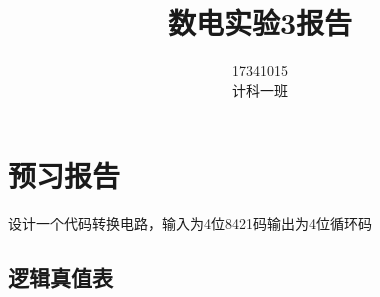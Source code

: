 \documentclass[11pt,UTF8]{ctexart}
\title{数电实验3报告}
\author{17341015\quad数据科学与计算机学院\\计科一班\quad陈鸿峥}
\date{}
\begin{document}
\maketitle
\vspace{-50pt}%

\lstset{language=C++,escapechar=`}

\section{预习报告}
\par 设计一个代码转换电路，输入为4位8421码输出为4位循环码
\subsection{逻辑真值表}
\end{document}
